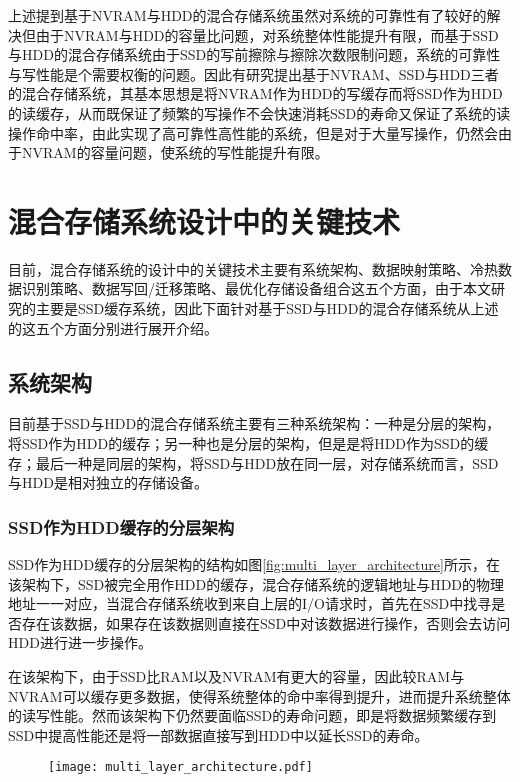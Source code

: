 上述提到基于NVRAM与HDD的混合存储系统虽然对系统的可靠性有了较好的解决但由于NVRAM与HDD的容量比问题，对系统整体性能提升有限，而基于SSD与HDD的混合存储系统由于SSD的写前擦除与擦除次数限制问题，系统的可靠性与写性能是个需要权衡的问题。因此有研究提出基于NVRAM、SSD与HDD三者的混合存储系统\cite{祝青2013混合存储系统研究}，其基本思想是将NVRAM作为HDD的写缓存而将SSD作为HDD的读缓存，从而既保证了频繁的写操作不会快速消耗SSD的寿命又保证了系统的读操作命中率，由此实现了高可靠性高性能的系统，但是对于大量写操作，仍然会由于NVRAM的容量问题，使系统的写性能提升有限。

\section{混合存储系统设计中的关键技术}

目前，混合存储系统的设计中的关键技术主要有系统架构、数据映射策略、冷热数据识别策略、数据写回/迁移策略、最优化存储设备组合这五个方面，由于本文研究的主要是SSD缓存系统，因此下面针对基于SSD与HDD的混合存储系统从上述的这五个方面分别进行展开介绍。

\subsection{系统架构}

目前基于SSD与HDD的混合存储系统主要有三种系统架构：一种是分层的架构，将SSD作为HDD的缓存；另一种也是分层的架构，但是是将HDD作为SSD的缓存；最后一种是同层的架构，将SSD与HDD放在同一层，对存储系统而言，SSD与HDD是相对独立的存储设备。

\subsubsection{SSD作为HDD缓存的分层架构}

SSD作为HDD缓存的分层架构的结构如图\ref{fig:multi_layer_architecture}所示，在该架构下，SSD被完全用作HDD的缓存，混合存储系统的逻辑地址与HDD的物理地址一一对应，当混合存储系统收到来自上层的I/O请求时，首先在SSD中找寻是否存在该数据，如果存在该数据则直接在SSD中对该数据进行操作，否则会去访问HDD进行进一步操作。

在该架构下，由于SSD比RAM以及NVRAM有更大的容量，因此较RAM与NVRAM可以缓存更多数据，使得系统整体的命中率得到提升，进而提升系统整体的读写性能。然而该架构下仍然要面临SSD的寿命问题，即是将数据频繁缓存到SSD中提高性能还是将一部数据直接写到HDD中以延长SSD的寿命。

\begin{figure}[!htp]
    \centering
    \texttt{[image: multi\_layer\_architecture.pdf]}
\end{figure}


